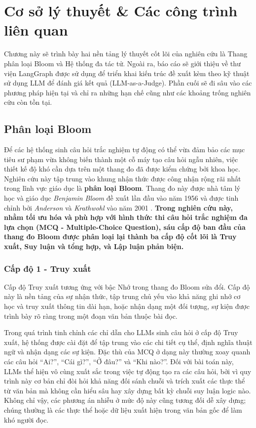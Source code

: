 \chapter{Cơ sở lý thuyết \& Các công trình liên quan}
\label{chap:co-so-ly-thuyet}

Chương này sẽ trình bày hai nền tảng lý thuyết cốt lõi của nghiên cứu là Thang phân loại Bloom và Hệ thống đa tác tử. Ngoài ra, báo cáo sẽ giới thiệu về thư viện LangGraph được sử dụng để triển khai kiến trúc đề xuất kèm theo kỹ thuật sử dụng LLM để đánh giá kết quả (LLM-as-a-Judge). Phần cuối sẽ đi sâu vào các phương pháp hiện tại và chỉ ra những hạn chế cũng như các khoảng trống nghiên cứu còn tồn tại.

\section{Phân loại Bloom}

Để các hệ thống sinh câu hỏi trắc nghiệm tự động có thể vừa đảm bảo các mục tiêu sư phạm vừa không biến thành một cỗ máy tạo câu hỏi ngẫu nhiên, việc thiết kế độ khó cần dựa trên một thang đo đã được kiểm chứng bởi khoa học. Nghiên cứu này tập trung vào khung nhận thức được công nhận rộng rãi nhất trong lĩnh vực giáo dục là \textbf{phân loại Bloom}. Thang đo này được nhà tâm lý học và giáo dục \textit{Benjamin Bloom} đề xuất lần đầu vào năm 1956 \cite{bloom1956taxonomy} và được tinh chỉnh bởi \textit{Anderson} và \textit{Krathwohl} vào năm 2001 \cite{anderson2001taxonomy}. \textbf{Trong nghiên cứu này, nhằm tối ưu hóa và phù hợp với hình thức thi câu hỏi trắc nghiệm đa lựa chọn (MCQ - Multiple-Choice Question), sáu cấp độ ban đầu của thang đo Bloom được phân loại lại thành ba cấp độ cốt lõi là Truy xuất, Suy luận và tổng hợp, và Lập luận phản biện.}

\subsection{Cấp độ 1 - Truy xuất}

Cấp độ Truy xuất tương ứng với bậc Nhớ trong thang đo Bloom sửa đổi. Cấp độ này là nền tảng của sự nhận thức, tập trung chủ yếu vào khả năng ghi nhớ cơ học và truy xuất thông tin dài hạn, hoặc nhận dạng một đối tượng, sự kiện được trình bày rõ ràng trong một đoạn văn bản thuộc bài đọc.

Trong quá trình tinh chỉnh các chỉ dẫn cho LLMs sinh câu hỏi ở cấp độ Truy xuất, hệ thống được cài đặt để tập trung vào các chi tiết cụ thể, định nghĩa thuật ngữ và nhận dạng các sự kiện. Đặc thù của MCQ ở dạng này thường xoay quanh các câu hỏi “Ai?”, “Cái gì?”, “Ở đâu?” và “Khi nào?”. Đối với bài toán này, LLMs thể hiện vô cùng xuất sắc trong việc tự động tạo ra các câu hỏi, bởi vì quy trình này cơ bản chỉ đòi hỏi khả năng đối sánh chuỗi và trích xuất các thực thể từ văn bản mà không cần hiểu sâu hay xây dựng bất kỳ chuỗi suy luận logic nào. Không chỉ vậy, các phương án nhiễu ở mức độ này cũng tương đối dễ xây dựng; chúng thường là các thực thể hoặc dữ liệu xuất hiện trong văn bản gốc để làm khó người đọc.

